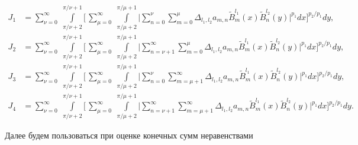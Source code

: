 \begin{align*} 


J_1&=\sum^\infty_{\nu=0}\;


\int\limits^{\pi/\nu+1}_{\pi/\nu+2}\biggl[\, 


\sum^\infty_{\mu=0}\;\int\limits^{\pi/\mu+1}_{\pi/\mu+2}\biggl| 


\sum^\nu_{n=0}\sum^\mu_{m=0}\Delta_{l_1,l_2}a_{m,n} 


\widetilde B_m^{l_1}(x)\widetilde B_n^{l_2}(y)\biggr|^{p_1}dx 


\biggr]^{p_2/p_1}dy,\\ 


%


J_2&=\sum^\infty_{\nu=0}\;


\int\limits^{\pi/\nu+1}_{\pi/\nu+2}\biggl[\, 


\sum^\infty_{\mu=0}\;\int\limits^{\pi/\mu+1}_{\pi/\mu+2}\biggl| 


\sum^\infty_{n=\nu+1}\sum^\mu_{m=0}\Delta_{l_1,l_2}a_{m,n} 


\widetilde B_m^{l_1}(x)\widetilde B_n^{l_2}(y)\biggr|^{p_1}dx 


\biggr]^{p_2/p_1}dy,\\


% 


J_3&=\sum^\infty_{\nu=0}\;


\int\limits^{\pi/\nu+1}_{\pi/\nu+2}\biggl[\, 


\sum^\infty_{\mu=0}\;\int\limits^{\pi/\mu+1}_{\pi/\mu+2}\biggl| 


\sum^\nu_{n=0}\sum^\infty_{m=\mu+1}\Delta_{l_1,l_2}a_{m,n} 


\widetilde B_m^{l_1}(x)\widetilde B_n^{l_2}(y)\biggr|^{p_1}dx 


\biggr]^{p_2/p_1}dy,\\ 


%


J_4&=\sum^\infty_{\nu=0}\;


\int\limits^{\pi/\nu+1}_{\pi/\nu+2}\biggl[\, 


\sum^\infty_{\mu=0}\;\int\limits^{\pi/\mu+1}_{\pi/\mu+2}\biggl| 


\sum^\infty_{n=\nu+1}\sum^\infty_{m=\mu+1}\Delta_{l_1,l_2}a_{m,n} 


\widetilde B_m^{l_1}(x)\widetilde B_n^{l_2}(y)\biggr|^{p_1}dx 


\biggr]^{p_2/p_1}dy.


\end{align*} 


Далее будем пользоваться при оценке конечных сумм неравенствами 


